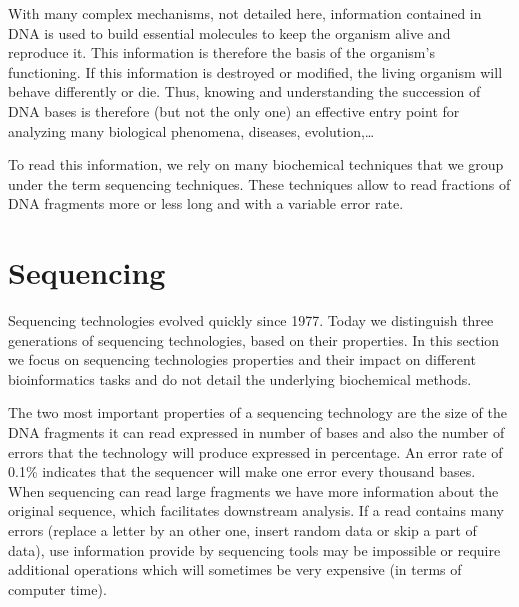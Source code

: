 \documentclass[./main.tex]{subfiles}
\begin{document}
With many complex mechanisms, not detailed here, information contained in DNA is used to build essential molecules to keep the organism alive and reproduce it.%
This information is therefore the basis of the organism's functioning. If this information is destroyed or modified, the living organism will behave differently or die. Thus, knowing and understanding the succession of DNA bases is therefore (but not the only one) an effective entry point for analyzing many biological phenomena, diseases, evolution,… %

To read this information, we rely on many biochemical techniques that we group under the term sequencing techniques. These techniques allow to read fractions of DNA fragments more or less long and with a variable error rate.%

\section{Sequencing} \label{section:introduction:sequencing}

Sequencing technologies evolved quickly since 1977\cite{sanger_sequencing}. Today we distinguish three generations of sequencing technologies, based on their properties.
In this section we focus on sequencing technologies properties and their impact on different bioinformatics tasks and do not detail the underlying biochemical methods.%

The two most important properties of a sequencing technology are the size of the DNA fragments it can read expressed in number of bases and also the number of errors that the technology will produce expressed in percentage. An error rate of 0.1\% indicates that the sequencer will make one error every thousand bases.
When sequencing can read large fragments we have more information about the original sequence, which facilitates downstream analysis.
If a read contains many errors (replace a letter by an other one, insert random data or skip a part of data), use information provide by sequencing tools may be impossible or require additional operations which will sometimes be very expensive (in terms of computer time).
\end{document}
